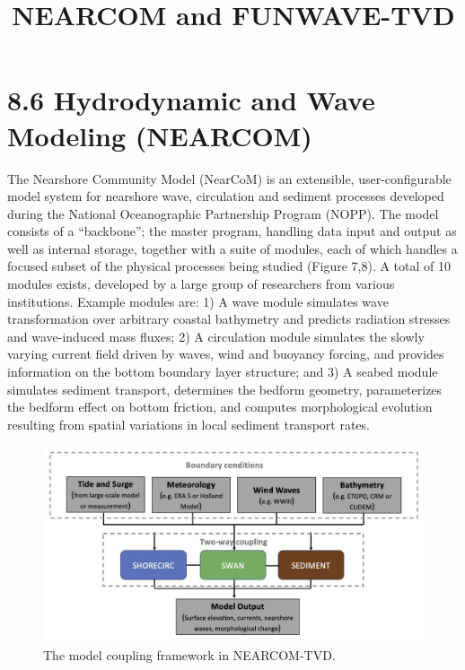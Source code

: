 \documentclass[preprint,12pt,authoryear] {elsarticle}
\begin{document}
\begin{frontmatter}

\title{NEARCOM and FUNWAVE-TVD
}










\end{frontmatter}


\section*{8.6 Hydrodynamic and Wave Modeling (NEARCOM)}

The Nearshore Community Model (NearCoM) is an extensible, user-configurable model system for nearshore wave, circulation and sediment processes developed during the National Oceanographic Partnership Program (NOPP). The model consists of a “backbone”; the master program, handling data input and output as well as internal storage, together with a suite of modules, each of which handles a focused subset of the physical processes being studied (Figure 7,8). A total of 10 modules exists, developed by a large group of researchers from various institutions. Example modules are: 1) A wave module simulates wave transformation over arbitrary coastal bathymetry and predicts radiation stresses and wave-induced mass fluxes; 2) A circulation module simulates the slowly varying current field driven by waves, wind and buoyancy forcing, and provides information on the bottom boundary layer structure; and 3) A seabed module simulates sediment transport, determines the bedform geometry, parameterizes the bedform effect on bottom friction, and computes morphological evolution resulting from spatial variations in local sediment transport rates.

\begin{figure}
\centering
\includegraphics[width=\textwidth]{./figures/nearcom_chart.png}
\caption{The model coupling framework in NEARCOM-TVD. }
\label{nearcom_chart.}
\centering
\end{figure}
\end{document}
